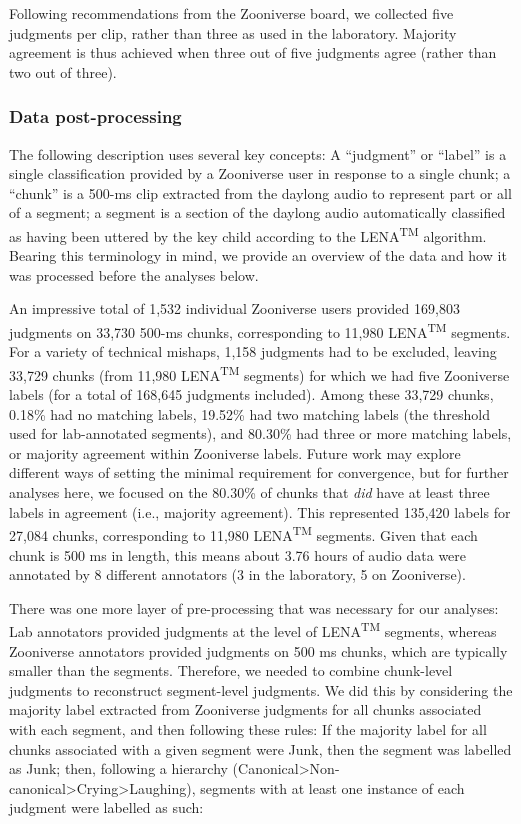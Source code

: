 \documentclass[english,,man]{apa6}
\begin{document}
Following recommendations from the Zooniverse board, we collected five judgments per clip, rather than three as used in the laboratory. Majority agreement is thus achieved when three out of five judgments agree (rather than two out of three).

\hypertarget{data-post-processing}{%
\subsubsection{Data post-processing}\label{data-post-processing}}

The following description uses several key concepts: A \enquote{judgment} or \enquote{label} is a single classification provided by a Zooniverse user in response to a single chunk; a \enquote{chunk} is a 500-ms clip extracted from the daylong audio to represent part or all of a segment; a segment is a section of the daylong audio automatically classified as having been uttered by the key child according to the LENA\textsuperscript{TM} algorithm. Bearing this terminology in mind, we provide an overview of the data and how it was processed before the analyses below.

An impressive total of 1,532 individual Zooniverse users provided 169,803 judgments on 33,730 500-ms chunks, corresponding to 11,980 LENA\textsuperscript{TM} segments. For a variety of technical mishaps, 1,158 judgments had to be excluded, leaving 33,729 chunks (from 11,980 LENA\textsuperscript{TM} segments) for which we had five Zooniverse labels (for a total of 168,645 judgments included). Among these 33,729 chunks, 0.18\% had no matching labels, 19.52\% had two matching labels (the threshold used for lab-annotated segments), and 80.30\% had three or more matching labels, or majority agreement within Zooniverse labels. Future work may explore different ways of setting the minimal requirement for convergence, but for further analyses here, we focused on the 80.30\% of chunks that \emph{did} have at least three labels in agreement (i.e., majority agreement). This represented 135,420 labels for 27,084 chunks, corresponding to 11,980 LENA\textsuperscript{TM} segments. Given that each chunk is 500 ms in length, this means about 3.76 hours of audio data were annotated by 8 different annotators (3 in the laboratory, 5 on Zooniverse).

There was one more layer of pre-processing that was necessary for our analyses: Lab annotators provided judgments at the level of LENA\textsuperscript{TM} segments, whereas Zooniverse annotators provided judgments on 500 ms chunks, which are typically smaller than the segments. Therefore, we needed to combine chunk-level judgments to reconstruct segment-level judgments. We did this by considering the majority label extracted from Zooniverse judgments for all chunks associated with each segment, and then following these rules: If the majority label for all chunks associated with a given segment were Junk, then the segment was labelled as Junk; then, following a hierarchy (Canonical\textgreater{}Non-canonical\textgreater{}Crying\textgreater{}Laughing), segments with at least one instance of each judgment were labelled as such:
\end{document}
